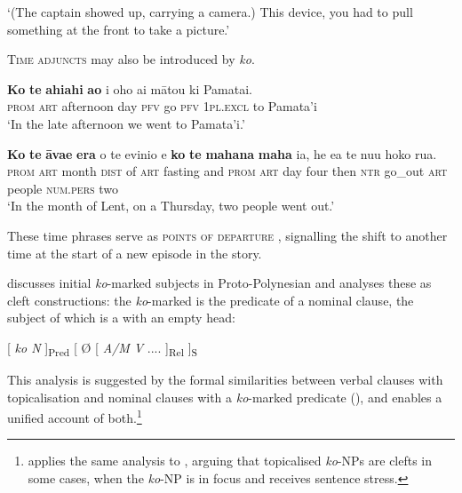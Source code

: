 \glt 
‘(The captain showed up, carrying a camera.) This device, you had to pull something at the front to take a picture.’ \textstyleExampleref{[R379.027]} 
\z

\textsc{Time adjuncts} may also be introduced by \textit{ko}. 

\ea\label{ex:8.87}
\gll \textbf{Ko} \textbf{te} \textbf{ahiahi} \textbf{{\ꞌ}ao} i oho ai mātou ki Pamata{\ꞌ}i. \\
\textsc{prom} \textsc{art} afternoon day \textsc{pfv} go \textsc{pfv} \textsc{1pl.excl} to Pamata’i \\

\glt 
‘In the late afternoon we went to Pamata’i.’ \textstyleExampleref{[Egt-02.275]}
\z

\ea\label{ex:8.88}
\gll \textbf{Ko} \textbf{te} \textbf{{\ꞌ}āva{\ꞌ}e} \textbf{era} o te evinio {\ꞌ}e \textbf{ko} \textbf{te} \textbf{mahana} \textbf{maha} ia,  he e{\ꞌ}a te nu{\ꞌ}u hoko rua.\\
\textsc{prom} \textsc{art} month \textsc{dist} of \textsc{art} fasting and \textsc{prom} \textsc{art} day four then  \textsc{ntr} go\_out \textsc{art} people \textsc{num.pers} two\\

\glt
‘In the month of Lent, on a Thursday, two people went out.’ \textstyleExampleref{[R357.001]} 
\z

These time phrases serve as \textsc{points of departure} \citep[39]{Levinsohn2007}, signalling the shift to another time at the start of a new episode in the story.

\citet[37]{Clark1976} discusses initial \textit{ko}{}-marked subjects in Proto-Polynesian and analyses these as cleft constructions: the \textit{ko}{}-marked  is the predicate of a nominal clause, the subject of which is a  with an empty head: 

\ea\label{ex:8.88a}
[ \textit{ko N} ]\textsubscript{Pred}   [ Ø [ \textit{A/M V} .... ]\textsubscript{Rel} ]\textsubscript{S} 
\z

This analysis is suggested by the formal similarities between verbal clauses with topicalisation and nominal clauses with a \textit{ko}{}-marked predicate (), and enables a unified account of both.\footnote{\label{fn:425}\citet{Bauer1991} applies the same analysis to , arguing that topicalised \textit{ko}{}-NPs are clefts in some cases, when the \textit{ko}{}-NP is in focus and receives sentence stress.} 

